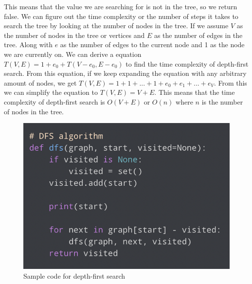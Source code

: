 \documentclass[12pt]{article}
\begin{document}
This means that the value we are searching for is not in the tree, so we return false.
We can figure out the time complexity or the number of steps it takes to search the tree by looking at the number of nodes in the tree.
If we assume $V$ as the number of nodes in the tree or vertices and $E$ as the number of edges in the tree.
Along with $e$ as the number of edges to the current node and 1 as the node we are currently on.
We can derive a equation $T(V, E) = 1 + e_0 + T(V - e_0, E - e_0)$ to find the time complexity of depth-first search.
From this equation, if we keep expanding the equation with any arbitrary amount of nodes, we get 
$T(V, E) = 1 + 1 + ... + 1 + e_0 + e_1 + ... + e_V$. From this we can simplify the equation to $T(V, E) = V + E$.
This means that the time complexity of depth-first search is $O(V + E)$ or $O(n)$ where $n$ is the number of nodes in the tree.

\begin{figure}[h!]
    \centering
    \includegraphics[scale=.75]{images/code.png}
    \caption{Sample code for depth-first search}
\end{figure}

\newpage
\end{document}
